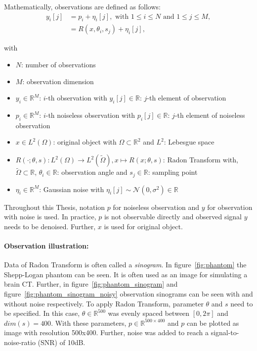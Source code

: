 Mathematically, observations are defined as follows:
\begin{equation}
    \label{eq:2Dreconstruction}
    \begin{aligned}
        y_i[j] &= p_i + \eta_i[j] , \text{ with } 1 \leq i \leq N \text{ and } 1 \leq j \leq M, \\
               &= R(x, \theta_i, s_j) + \eta_i[j],
    \end{aligned}
\end{equation}

with
\begin{itemize}
    \item $N$: number of observations
    \item $M$: observation dimension
    \item $y_i \in \mathbb{R}^M$:  $i$-th observation with $y_i[j] \in \mathbb{R}$: $j$-th element of observation
    \item $p_i \in \mathbb{R}^M$:  $i$-th noiseless observation with $p_i[j] \in \mathbb{R}$: $j$-th element of noiseless observation
    \item $x \in L^2(\Omega)$: original object with $\Omega \subset \mathbb{R}^2 $ and $L^2$: Lebesgue space
    \item $R(\cdot; \theta, s): L^2(\Omega) \to L^2(\tilde{\Omega}) , x \mapsto R(x; \theta,s)$: Radon Transform \cite{radonTransform} with,\\
        $\tilde{\Omega} \subset \mathbb{R}$, $\theta_i \in \mathbb{R}$: observation angle and $s_j \in \mathbb{R}$: sampling point 
    \item $\eta_i \in \mathbb{R}^M$: Gaussian noise with $\eta_i[j] \sim \mathcal{N}(0,\sigma^2) \in \mathbb{R}$
\end{itemize}

\begin{tcolorbox}[colback=red!5!white,colframe=red!75!black]
    Throughout this Thesis, notation $p$ for noiseless observation and $y$ for observation with noise is used.
    In practice, $p$ is not observable directly and observed signal $y$ needs to be denoised.
    Further, $x$ is used for original object.
\end{tcolorbox}

\paragraph{Observation illustration:}

Data of Radon Transform is often called a \textit{sinogram}.
In figure~\ref{fig:phantom} the Shepp-Logan phantom can be seen.
It is often used as an image for simulating a brain CT.
Further, in figure~\ref{fig:phantom_sinogram} and figure~\ref{fig:phantom_sinogram_noisy} 
observation sinograms can be seen with and without noise respectively. 
To apply Radon Transform, parameter $\theta$ and $s$ need to be specified.
In this case, $\theta \in \mathbb{R}^{500}$ was evenly spaced
between $[0, 2 \pi]$ and $dim(s) = 400$. 
With these parameters, $p \in \mathbb{R}^{500 \times 400}$ and $p$ can be plotted as image with resolution 500x400. 
Further, noise was added to reach a signal-to-noise-ratio (SNR) of 10dB.

